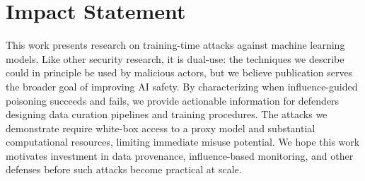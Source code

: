 \documentclass{article}
\theoremstyle{plain}
\theoremstyle{definition}
\theoremstyle{remark}
\begin{document}



\section*{Impact Statement}

This work presents research on training-time attacks against machine learning models. Like other security research, it is dual-use: the techniques we describe could in principle be used by malicious actors, but we believe publication serves the broader goal of improving AI safety. By characterizing when influence-guided poisoning succeeds and fails, we provide actionable information for defenders designing data curation pipelines and training procedures. The attacks we demonstrate require white-box access to a proxy model and substantial computational resources, limiting immediate misuse potential. We hope this work motivates investment in data provenance, influence-based monitoring, and other defenses before such attacks become practical at scale.




\end{document}
